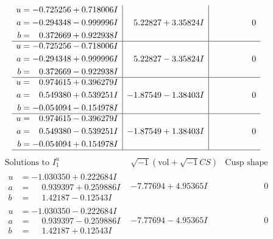 \documentclass[1p]{elsarticle_modified}
\theoremstyle{definition}
\newcommand{\I}{\sqrt{-1}}
\begin{document}
$$\begin{array}{c|c|c}
\begin{aligned}
u &= -0.725256 + 0.718006 I \\
a &= -0.294348 - 0.999996 I \\
b &= \phantom{-}0.372669 + 0.922938 I\end{aligned}
 & \phantom{-}5.22827 + 3.35824 I & \phantom{-0.000000 } 0 \\ \hline\begin{aligned}
u &= -0.725256 - 0.718006 I \\
a &= -0.294348 + 0.999996 I \\
b &= \phantom{-}0.372669 - 0.922938 I\end{aligned}
 & \phantom{-}5.22827 - 3.35824 I & \phantom{-0.000000 } 0 \\ \hline\begin{aligned}
u &= \phantom{-}0.974615 + 0.396279 I \\
a &= \phantom{-}0.549380 + 0.539251 I \\
b &= -0.054094 - 0.154978 I\end{aligned}
 & -1.87549 - 1.38403 I & \phantom{-0.000000 } 0 \\ \hline\begin{aligned}
u &= \phantom{-}0.974615 - 0.396279 I \\
a &= \phantom{-}0.549380 - 0.539251 I \\
b &= -0.054094 + 0.154978 I\end{aligned}
 & -1.87549 + 1.38403 I & \phantom{-0.000000 } 0\\
 \hline 
 \end{array}$$\newpage$$\begin{array}{c|c|c}  
\text{Solutions to }I^u_{1}& \I (\text{vol} + \sqrt{-1}CS) & \text{Cusp shape}\\
 \hline 
\begin{aligned}
u &= -1.030350 + 0.222684 I \\
a &= \phantom{-}0.939397 + 0.259886 I \\
b &= \phantom{-}1.42187 - 0.12543 I\end{aligned}
 & -7.77694 + 4.95365 I & \phantom{-0.000000 } 0 \\ \hline\begin{aligned}
u &= -1.030350 - 0.222684 I \\
a &= \phantom{-}0.939397 - 0.259886 I \\
b &= \phantom{-}1.42187 + 0.12543 I\end{aligned}
 & -7.77694 - 4.95365 I & \phantom{-0.000000 } 0 \\ \hline\begin{aligned}

\end{aligned}
\end{array}$$
\end{document}

